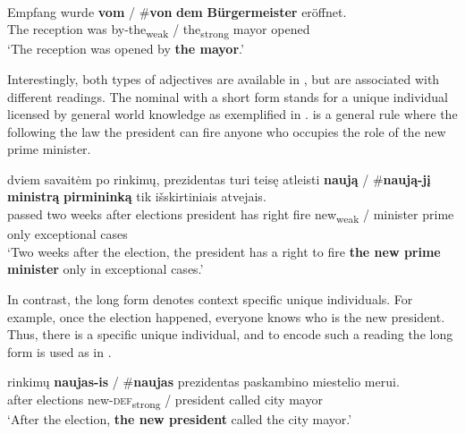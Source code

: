 \documentclass[output=paper,
modfonts
]{langscibook}
\begin{document}
\begin{exe}
	\ex \label{ex:sereikaite:45}
	 \\
	 {Empfang} {wurde} \textbf{vom} \textnormal{/} \textnormal{\#}\textbf{von} \textbf{dem} \textbf{{Bürgermeister}} {eröffnet}.\\
	The reception was {by-the\textsubscript{weak}} / \phantom{\#}{by} {the\textsubscript{strong}} {mayor} opened\\
	\trans `The reception was opened by \textbf{the mayor}.’ \citep[31]{Schwarz2009}
\end{exe}

Interestingly, both types of adjectives are available in , but are associated with different readings. The nominal with a short form stands for a unique individual licensed by general world knowledge as exemplified in .  is a general rule where the following the law the president can fire anyone who occupies the role of the new prime minister.

\begin{exe}
	\ex \label{ex:sereikaite:46}
	 {dviem} {savaitėm} {po} {rinkimų}, {prezidentas} {turi} {teisę} {atleisti} \textbf{naują} \textnormal{/} \textnormal{\#}\textbf{naują-jį} \textbf{{ministrą}} \textbf{{pirmininką}} {tik} {išskirtiniais} {atvejais}.\\
	passed two weeks after elections president has right fire {new\textsubscript{weak}} /  {minister} {prime} only exceptional cases\\
	\trans `Two weeks after the election, the president has a right to fire \textbf{the new prime minister} only in exceptional cases.' 
\end{exe}

In contrast, the long form denotes context specific unique individuals. For example, once the election happened, everyone knows who is the new president. Thus, there is a specific unique individual, and to encode such a reading the long form is used as in .
 
\begin{exe} 
	\ex \label{ex:sereikaite:47}
	 {rinkimų} \textbf{naujas-is} \textnormal{/} \textnormal{\#}\textbf{naujas} {prezidentas} {paskambino} {miestelio} {merui}.\\
	after elections {new-\textsc{def}\textsubscript{strong}} /  president called city mayor\\
	\trans `After the election, \textbf{the new president} called the city mayor.' 
\end{exe} 
\end{document}
